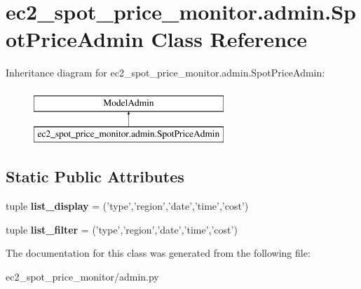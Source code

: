 \hypertarget{classec2__spot__price__monitor_1_1admin_1_1SpotPriceAdmin}{\section{ec2\-\_\-spot\-\_\-price\-\_\-monitor.\-admin.\-Spot\-Price\-Admin Class Reference}
\label{classec2__spot__price__monitor_1_1admin_1_1SpotPriceAdmin}
}
Inheritance diagram for ec2\-\_\-spot\-\_\-price\-\_\-monitor.\-admin.\-Spot\-Price\-Admin\-:\begin{figure}[H]
\begin{center}
\leavevmode
\includegraphics[height=2.000000cm]{classec2__spot__price__monitor_1_1admin_1_1SpotPriceAdmin}
\end{center}
\end{figure}
\subsection*{Static Public Attributes}
\begin{DoxyCompactItemize}
\item 
\hypertarget{classec2__spot__price__monitor_1_1admin_1_1SpotPriceAdmin_ac017534702131c34741cf715c6aed355}{tuple {\bfseries list\-\_\-display} = ('type','region','date','time','cost')}\label{classec2__spot__price__monitor_1_1admin_1_1SpotPriceAdmin_ac017534702131c34741cf715c6aed355}

\item 
\hypertarget{classec2__spot__price__monitor_1_1admin_1_1SpotPriceAdmin_a22b945d27a6874bd5648ea0a876a19aa}{tuple {\bfseries list\-\_\-filter} = ('type','region','date','time','cost')}\label{classec2__spot__price__monitor_1_1admin_1_1SpotPriceAdmin_a22b945d27a6874bd5648ea0a876a19aa}

\end{DoxyCompactItemize}


The documentation for this class was generated from the following file\-:\begin{DoxyCompactItemize}
\item 
ec2\-\_\-spot\-\_\-price\-\_\-monitor/admin.\-py\end{DoxyCompactItemize}
